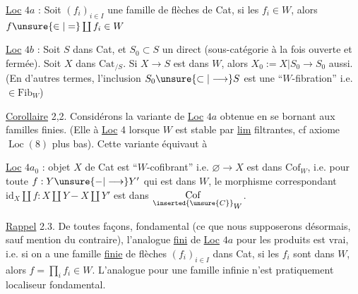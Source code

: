 
\uline{Loc} $4a$ : Soit $(f_i)_{i\in I}$ une famille de flèches de Cat, si les $f_i\in W$, alors $f\unsure{\in|=}\coprod f_i\in W$

\uline{Loc} $4b$ : Soit $S$ dans Cat, et $S_0\subset S$ un  direct (sous-catégorie à la fois ouverte et fermée). Soit $X$ dans $\mathrm{Cat}_{/S}$. Si $X\longrightarrow S$ est dans $W$, alors $X_0:=X\vert S_0\longrightarrow S_0$ aussi. (En d'autres termes, l'inclusion $S_0\unsure{\subset|\longrightarrow} S$ est une ``$W$-fibration'' i.e.  $\in\mathrm{Fib}_W$)

\uline{Corollaire} 2,2. Considérons la variante de \uline{Loc} $4a$ obtenue en se bornant aux familles finies. (Elle  à \uline{Loc} 4 lorsque $W$ est stable par \uline{lim} filtrantes, cf axiome $\operatorname{Loc}(8)$ plus bas). Cette variante équivaut à

\uline{Loc} $4a_0$ :  objet $X$ de Cat est ``$W$-cofibrant'' i.e. $\varnothing\longrightarrow X$ est dans $\mathrm{Cof}_W$, i.e. pour toute $f:Y\unsure{{-}|\longrightarrow}Y'$ qui est dans $W$, le morphisme correspondant $\mathrm{id}_X\amalg f:X\amalg Y{-}X\amalg Y'$ est dans $\underset{\inserted{\unsure{C}}}{\mathrm{Cof}}_W$.

\uline{Rappel} 2.3. De toutes façons,   fondamental (ce que nous supposerons désormais, sauf mention du contraire), l'analogue \uline{fini} de \uline{Loc} $4a$ pour les produits est vrai, i.e. si  on a une famille \uline{finie} de flèches $(f_i)_{i\in I}$ dans Cat, si les $f_i$ sont dans $W$, alors $f=\prod_i f_i\in W$. L'analogue pour une famille infinie n'est  pratiquement  localiseur fondamental.

